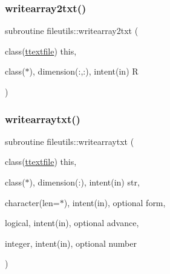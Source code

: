 \subsubsection{\texorpdfstring{writearray2txt()}{writearray2txt()}}
{\footnotesize\ttfamily subroutine fileutils\+::writearray2txt (\begin{DoxyParamCaption}\item[{class(\mbox{\hyperlink{structfileutils_1_1ttextfile}{ttextfile}})}]{this,  }\item[{class($\ast$), dimension(\+:,\+:), intent(in)}]{R }\end{DoxyParamCaption})\hspace{0.3cm}{\ttfamily [private]}}

\mbox{\label{namespacefileutils_a94187e504a2d61ed06c891f18cab95e4}} 
\subsubsection{\texorpdfstring{writearraytxt()}{writearraytxt()}}
{\footnotesize\ttfamily subroutine fileutils\+::writearraytxt (\begin{DoxyParamCaption}\item[{class(\mbox{\hyperlink{structfileutils_1_1ttextfile}{ttextfile}})}]{this,  }\item[{class($\ast$), dimension(\+:), intent(in)}]{str,  }\item[{character(len=$\ast$), intent(in), optional}]{form,  }\item[{logical, intent(in), optional}]{advance,  }\item[{integer, intent(in), optional}]{number }\end{DoxyParamCaption})\hspace{0.3cm}{\ttfamily [private]}}

\mbox{\label{namespacefileutils_a0c8c6f2ca823e9e6d8a31d4002347730}} 

